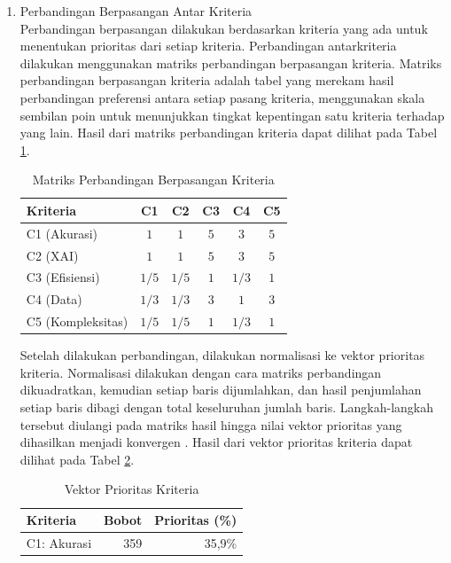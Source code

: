 \begin{enumerate}
\begin{enumerate}
	\end{enumerate}
	\item Perbandingan Berpasangan Antar Kriteria \\
	Perbandingan berpasangan dilakukan berdasarkan kriteria yang ada untuk menentukan prioritas dari setiap kriteria. Perbandingan antarkriteria dilakukan menggunakan matriks perbandingan berpasangan kriteria. Matriks perbandingan berpasangan kriteria adalah tabel yang merekam hasil perbandingan preferensi antara setiap pasang kriteria, menggunakan skala sembilan poin untuk menunjukkan tingkat kepentingan satu kriteria terhadap yang lain. Hasil dari matriks perbandingan kriteria dapat dilihat pada Tabel \ref{tab:perbandingan_kriteria}.
	\begin{table}[H]
		\centering
		\caption{Matriks Perbandingan Berpasangan Kriteria}
		\label{tab:perbandingan_kriteria}
		\begin{tabular}{|l|c|c|c|c|c|}
			\hline
			\textbf{Kriteria} & \textbf{C1} & \textbf{C2} & \textbf{C3} & \textbf{C4} & \textbf{C5} \\ \hline
			C1 (Akurasi) & $1$ & $1$ & $5$ & $3$ & $5$ \\ \hline
			C2 (XAI) & $1$ & $1$ & $5$ & $3$ & $5$ \\ \hline
			C3 (Efisiensi) & $1/5$ & $1/5$ & $1$ & $1/3$ & $1$ \\ \hline
			C4 (Data) & $1/3$ & $1/3$ & $3$ & $1$ & $3$ \\ \hline
			C5 (Kompleksitas) & $1/5$ & $1/5$ & $1$ & $1/3$ & $1$ \\ \hline
		\end{tabular}
	\end{table}
	Setelah dilakukan perbandingan, dilakukan normalisasi ke vektor prioritas kriteria. Normalisasi dilakukan dengan cara matriks perbandingan dikuadratkan, kemudian setiap baris dijumlahkan, dan hasil penjumlahan setiap baris dibagi dengan total keseluruhan jumlah baris. Langkah-langkah tersebut diulangi pada matriks hasil hingga nilai vektor prioritas yang dihasilkan menjadi konvergen \textcite{1000minds2025ahp}. Hasil dari vektor prioritas kriteria dapat dilihat pada Tabel \ref{tab:prioritas_kriteria}.
	\begin{table}[h]
		\centering
		\caption{Vektor Prioritas Kriteria}
		\label{tab:prioritas_kriteria}
		\begin{tabular}{|l|r|r|}
			\hline
			\textbf{Kriteria} & \textbf{Bobot} & \textbf{Prioritas} (\%) \\ \hline
			C1: Akurasi & 359 & 35,9\% \\ \hline

\end{tabular}
\end{table}
\end{enumerate}
